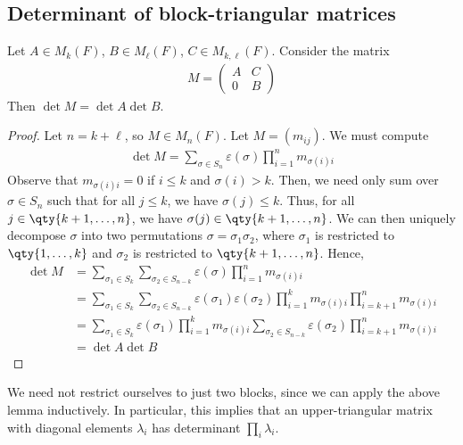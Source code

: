 \subsection{Determinant of block-triangular matrices}
\begin{lemma}
	Let $A \in M_k(F)$, $B \in M_\ell(F)$, $C \in M_{k, \ell}(F)$.
	Consider the matrix
	\begin{align*}
		M = \begin{pmatrix}
			A & C \\
			0 & B
		\end{pmatrix}
	\end{align*}
	Then $\det M = \det A \det B$.
\end{lemma}
\begin{proof}
	Let $n = k + \ell$, so $M \in M_n(F)$.
	Let $M = (m_{ij})$.
	We must compute
	\begin{align*}
		\det M = \sum_{\sigma \in S_n} \varepsilon(\sigma) \prod_{i=1}^n m_{\sigma(i) i}
	\end{align*}
	Observe that $m_{\sigma(i) i} = 0$ if $i \leq k$ and $\sigma(i) > k$.
	Then, we need only sum over $\sigma \in S_n$ such that for all $j \leq k$, we have $\sigma(j) \leq k$.
	Thus, for all $j \in \qty{k+1, \dots, n}$, we have $\sigma(j) \in \qty{k+1, \dots, n}$.
	We can then uniquely decompose $\sigma$ into two permutations $\sigma = \sigma_1 \sigma_2$, where $\sigma_1$ is restricted to $\qty{1, \dots, k}$ and $\sigma_2$ is restricted to $\qty{k+1, \dots, n}$.
	Hence,
	\begin{align*}
		\det M & = \sum_{\sigma_1 \in S_k} \sum_{\sigma_2 \in S_{n-k}} \varepsilon(\sigma) \prod_{i=1}^n m_{\sigma(i) i}                                                         \\
		       & = \sum_{\sigma_1 \in S_k} \sum_{\sigma_2 \in S_{n-k}} \varepsilon(\sigma_1) \varepsilon(\sigma_2) \prod_{i=1}^k m_{\sigma(i) i} \prod_{i=k+1}^n m_{\sigma(i) i} \\
		       & = \sum_{\sigma_1 \in S_k} \varepsilon(\sigma_1) \prod_{i=1}^k m_{\sigma(i) i} \sum_{\sigma_2 \in S_{n-k}} \varepsilon(\sigma_2) \prod_{i=k+1}^n m_{\sigma(i) i} \\
		       & = \det A \det B
	\end{align*}
\end{proof}
\begin{corollary}
	We need not restrict ourselves to just two blocks, since we can apply the above lemma inductively.
	In particular, this implies that an upper-triangular matrix with diagonal elements $\lambda_i$ has determinant $\prod_i \lambda_i$.
\end{corollary}